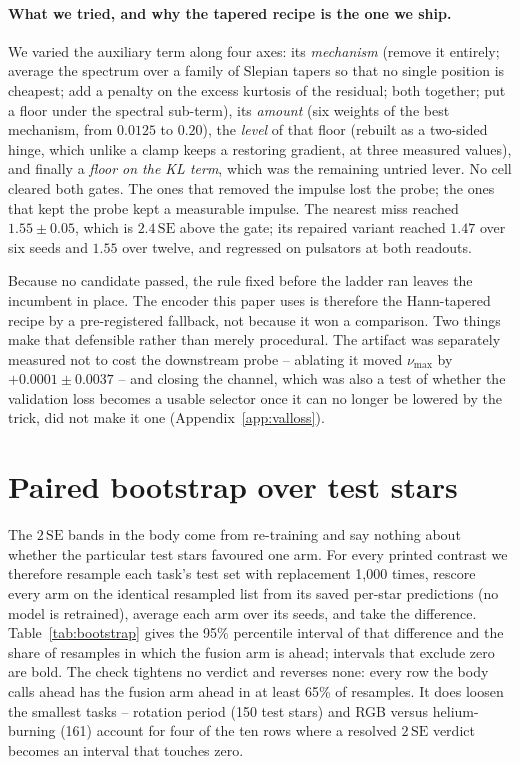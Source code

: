 \documentclass{article}
\begin{document}
\paragraph{What we tried, and why the tapered recipe is the one we ship.} We varied the auxiliary
term along four axes: its \emph{mechanism} (remove it entirely; average the spectrum over a family of
Slepian tapers so that no single position is cheapest; add a penalty on the excess kurtosis of the
residual; both together; put a floor under the spectral sub-term), its \emph{amount} (six weights of
the best mechanism, from $0.0125$ to $0.20$), the \emph{level} of that floor (rebuilt as a two-sided
hinge, which unlike a clamp keeps a restoring gradient, at three measured values), and finally a
\emph{floor on the KL term}, which was the remaining untried lever. No cell cleared both gates. The
ones that removed the impulse lost the probe; the ones that kept the probe kept a measurable impulse.
The nearest miss reached $1.55 \pm 0.05$, which is $2.4\,\mathrm{SE}$ above the gate; its repaired
variant reached $1.47$ over six seeds and $1.55$ over twelve, and regressed on pulsators at both
readouts.

Because no candidate passed, the rule fixed before the ladder ran leaves the incumbent in place. The
encoder this paper uses is therefore the Hann-tapered recipe by a pre-registered fallback, not
because it won a comparison. Two things make that defensible rather than merely procedural. The
artifact was separately measured not to cost the downstream probe -- ablating it moved $\nu_{\max}$
by $+0.0001 \pm 0.0037$ -- and closing the channel, which was also a test of whether the validation
loss becomes a usable selector once it can no longer be lowered by the trick, did not make it one
(Appendix~\ref{app:valloss}).

\section{Paired bootstrap over test stars}
\label{app:bootstrap}

The $2\,\mathrm{SE}$ bands in the body come from re-training and say nothing about whether the
particular test stars favoured one arm. For every printed contrast we therefore resample each task's
test set with replacement 1{,}000 times, rescore every arm on the identical resampled list from its
saved per-star predictions (no model is retrained), average each arm over its seeds, and take the
difference. Table~\ref{tab:bootstrap} gives the 95\% percentile interval of that difference and the
share of resamples in which the fusion arm is ahead; intervals that exclude zero are bold. The check
tightens no verdict and reverses none: every row the body calls ahead has the fusion arm ahead in at
least 65\% of resamples. It does loosen the smallest tasks -- rotation period (150 test stars) and
RGB versus helium-burning (161) account for four of the ten rows where a resolved $2\,\mathrm{SE}$
verdict becomes an interval that touches zero.
\end{document}
